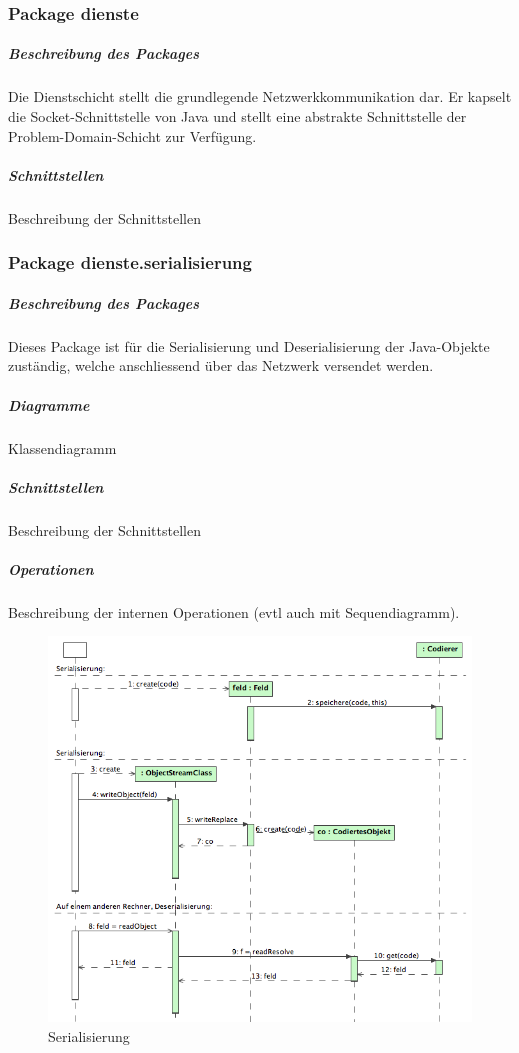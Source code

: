 \documentclass[a4paper,12pt,halfparskip,DIV12]{scrartcl}
\begin{document}
\clearpage
\subsubsection{Package dienste} %
\label{ssub:package_dienste}
\subparagraph{Beschreibung des Packages} %
\label{ssub:beschreibung_des_packages}
Die Dienstschicht stellt die grundlegende Netzwerkkommunikation dar. Er kapselt die Socket-Schnittstelle von Java und stellt eine abstrakte Schnittstelle der Problem-Domain-Schicht zur Verfügung.
\subparagraph{Schnittstellen} %
\label{ssub:schnittstellen}
Beschreibung der Schnittstellen

\clearpage
\subsubsection{Package dienste.serialisierung} %
\label{ssub:package_dienste_serialisierung}
\subparagraph{Beschreibung des Packages} %
\label{ssub:beschreibung_des_packages}
Dieses Package ist für die Serialisierung und Deserialisierung der Java-Objekte zuständig, welche anschliessend über das Netzwerk versendet werden.
\subparagraph{Diagramme} %
\label{ssub:diagramme}
Klassendiagramm
\subparagraph{Schnittstellen} %
\label{ssub:schnittstellen}
Beschreibung der Schnittstellen
\subparagraph{Operationen} %
\label{ssub:operationen}
Beschreibung der internen Operationen (evtl auch mit Sequendiagramm).
\begin{figure}
	\centering
	\includegraphics[width=\textwidth]{dienste_serialisierung}
	\caption{Serialisierung}
	\label{fig:dienste_serialisierung}
\end{figure}
\end{document}
